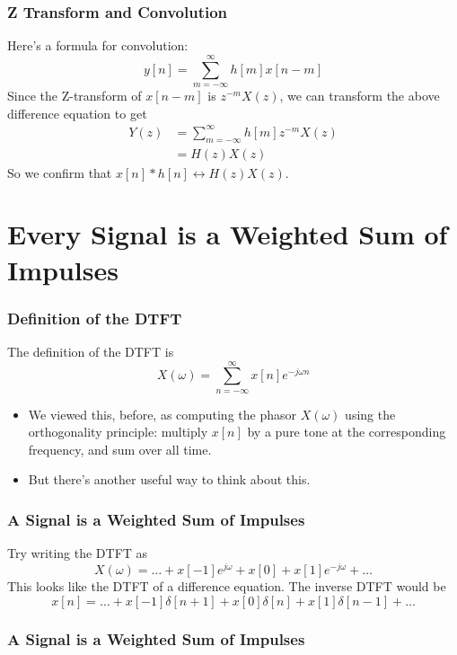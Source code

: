 \begin{frame}
  \frametitle{Z Transform and Convolution}
  
  Here's a formula for convolution:
  \[
  y[n] = \sum_{m=-\infty}^\infty h[m]x[n-m]
  \]
  Since the Z-transform of $x[n-m]$ is $z^{-m}X(z)$, we can transform
  the above difference equation to get
  \begin{align*}
  Y(z) &= \sum_{m=-\infty}^\infty h[m]z^{-m}X(z)\\
  &= H(z)X(z)
  \end{align*}
  So we confirm that $x[n]\ast h[n]\leftrightarrow H(z)X(z)$.
\end{frame}



\section[Impulses]{Every Signal is a Weighted Sum of Impulses}
\setcounter{subsection}{1}

\begin{frame}
  \frametitle{Definition of the DTFT}

  The definition of the DTFT is
  \[
  X(\omega)  = \sum_{n=-\infty}^\infty x[n]e^{-j\omega n}
  \]
  \begin{itemize}
  \item We viewed this, before, as computing the phasor $X(\omega)$ using
    the orthogonality principle: multiply $x[n]$ by a pure tone at the
    corresponding frequency, and sum over all time.
  \item But there's another useful way to think about this.
  \end{itemize}
\end{frame}

\begin{frame}
  \frametitle{A Signal is a Weighted Sum of Impulses}

  Try writing the DTFT as
  \[
  X(\omega) = \ldots + x[-1]e^{j\omega} + x[0] + x[1]e^{-j\omega} + \ldots
  \]
  This looks like the DTFT of a difference equation.  The inverse DTFT would be
  \[
  x[n] = \ldots + x[-1]\delta[n+1] + x[0]\delta[n] + x[1]\delta[n-1] + \ldots
  \]
\end{frame}
  
\begin{frame}
  \frametitle{A Signal is a Weighted Sum of Impulses}
  
  \centerline{}

\end{frame}

